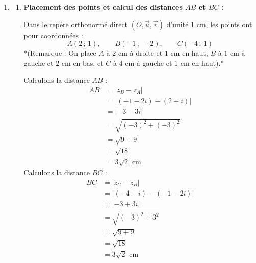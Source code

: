 \documentclass[12pt,a4paper]{article}
\begin{document}
\begin{enumerate}
\begin{enumerate}
$$        \qquad \text{et} \qquad
        \begin{aligned}
            z_2 &= \dfrac{-(5 + i) + (3 - 3i)}{2} \\
            &= \dfrac{-5 - i + 3 - 3i}{2} \\
            &= \dfrac{-2 - 4i}{2} \\
            &= -1 - 2i
        \end{aligned}
        $$
        L'ensemble des solutions de l'équation $p(z) = 0$ dans $\mathbb{C}$ est donc :
        $$
        \mathcal{S} = \left\{ 2 + i \,;\, -1 - 2i \,;\, -4 + i \right\}
        $$
    \end{enumerate}

    \vspace{0.5cm}

    \item 
    \begin{enumerate}
        \item \textbf{Placement des points et calcul des distances $AB$ et $BC$ :}
        
        Dans le repère orthonormé direct $(O, \vec{u}, \vec{v})$ d'unité $1 \text{ cm}$, les points ont pour coordonnées :
        $$
        A(2 \,;\, 1), \qquad B(-1 \,;\, -2), \qquad C(-4 \,;\, 1)
        $$
        *(Remarque : On place $A$ à $2 \text{ cm}$ à droite et $1 \text{ cm}$ en haut, $B$ à $1 \text{ cm}$ à gauche et $2 \text{ cm}$ en bas, et $C$ à $4 \text{ cm}$ à gauche et $1 \text{ cm}$ en haut).*
        
        Calculons la distance $AB$ :
        $$
        \begin{aligned}
            AB &= |z_B - z_A| \\
            &= |(-1 - 2i) - (2 + i)| \\
            &= |-3 - 3i| \\
            &= \sqrt{(-3)^2 + (-3)^2} \\
            &= \sqrt{9 + 9} \\
            &= \sqrt{18} \\
            &= 3\sqrt{2} \text{ cm}
        \end{aligned}
        $$
        Calculons la distance $BC$ :
        $$
        \begin{aligned}
            BC &= |z_C - z_B| \\
            &= |(-4 + i) - (-1 - 2i)| \\
            &= |-3 + 3i| \\
            &= \sqrt{(-3)^2 + 3^2} \\
            &= \sqrt{9 + 9} \\
            &= \sqrt{18} \\
            &= 3\sqrt{2} \text{ cm}
        \end{aligned}
        $$


\end{enumerate}
\end{enumerate}
\end{document}

